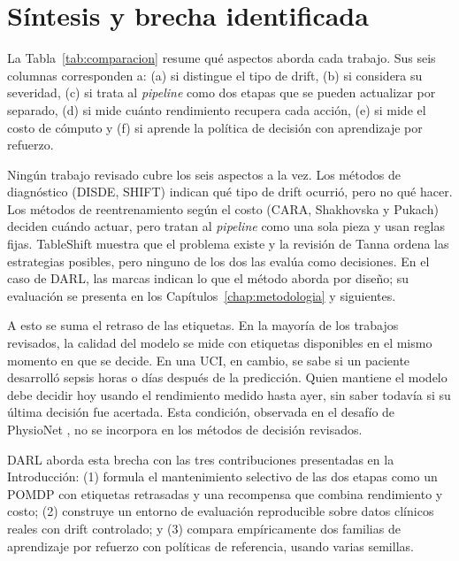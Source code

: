 \section{Síntesis y brecha identificada}
\label{sec:lit_brecha}

La Tabla~\ref{tab:comparacion} resume qué aspectos aborda cada trabajo. Sus seis columnas
corresponden a: (a) si distingue el tipo de drift, (b) si considera su severidad, (c) si
trata al \textit{pipeline} como dos etapas que se pueden actualizar por separado, (d) si
mide cuánto rendimiento recupera cada acción, (e) si mide el costo de cómputo y (f) si
aprende la política de decisión con aprendizaje por refuerzo.



Ningún trabajo revisado cubre los seis aspectos a la vez. Los métodos de diagnóstico (DISDE,
SHIFT) indican qué tipo de drift ocurrió, pero no qué hacer. Los métodos de reentrenamiento
según el costo (CARA, Shakhovska y Pukach) deciden cuándo actuar, pero tratan al
\textit{pipeline} como una sola pieza y usan reglas fijas. TableShift muestra que el
problema existe y la revisión de Tanna ordena las estrategias posibles, pero ninguno de los
dos las evalúa como decisiones. En el caso de DARL, las marcas indican lo que el método
aborda por diseño; su evaluación se presenta en los Capítulos~\ref{chap:metodologia} y
siguientes.

A esto se suma el retraso de las etiquetas. En la mayoría de los trabajos revisados, la
calidad del modelo se mide con etiquetas disponibles en el mismo momento en que se decide.
En una UCI, en cambio, se sabe si un paciente desarrolló sepsis horas o días después de la
predicción. Quien mantiene el modelo debe decidir hoy usando el rendimiento medido hasta
ayer, sin saber todavía si su última decisión fue acertada. Esta condición, observada en
el desafío de PhysioNet \cite{reyna2020sepsis}, no se incorpora en los métodos de decisión
revisados.

DARL aborda esta brecha con las tres contribuciones presentadas en la Introducción: (1)
formula el mantenimiento selectivo de las dos etapas como un POMDP con etiquetas
retrasadas y una recompensa que combina rendimiento y costo; (2) construye un entorno de
evaluación reproducible sobre datos clínicos reales con drift controlado; y (3) compara
empíricamente dos familias de aprendizaje por refuerzo con políticas de referencia, usando
varias semillas.

